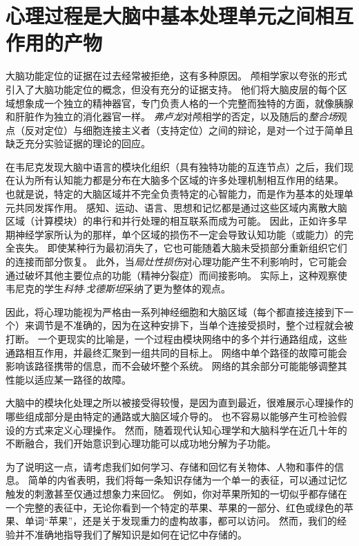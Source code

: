 \section{心理过程是大脑中基本处理单元之间相互作用的产物}

大脑功能定位的证据在过去经常被拒绝，这有多种原因。
颅相学家以夸张的形式引入了大脑功能定位的概念，但没有充分的证据支持。
他们将大脑皮层的每个区域想象成一个独立的精神器官，专门负责人格的一个完整而独特的方面，就像胰腺和肝脏作为独立的消化器官一样。
\textit{弗卢龙}对颅相学的否定，以及随后的\textit{整合场}观点（反对定位）与细胞连接主义者（支持定位）之间的辩论，是对一个过于简单且缺乏充分实验证据的理论的回应。


在韦尼克发现大脑中语言的模块化组织（具有独特功能的互连节点）之后，我们现在认为所有认知能力都是分布在大脑多个区域的许多处理机制相互作用的结果。
也就是说，特定的大脑区域并不完全负责特定的心智能力，而是作为基本的处理单元共同发挥作用。
感知、运动、语言、思想和记忆都是通过这些区域内离散大脑区域（计算模块）的串行和并行处理的相互联系而成为可能。
因此，正如许多早期神经学家所认为的那样，单个区域的损伤不一定会导致认知功能（或能力）的完全丧失。
即使某种行为最初消失了，它也可能随着大脑未受损部分重新组织它们的连接而部分恢复。
此外，当\textit{局灶性损伤}对心理功能产生不利影响时，它可能会通过破坏其他主要位点的功能（精神分裂症）而间接影响。
实际上，这种观察使韦尼克的学生\textit{科特$\cdot$戈德斯坦}采纳了更为整体的观点。



因此，将心理功能视为严格由一系列神经细胞和大脑区域（每个都直接连接到下一个）来调节是不准确的，因为在这种安排下，当单个连接受损时，整个过程就会被打断。
一个更现实的比喻是，一个过程由模块网络中的多个并行通路组成，这些通路相互作用，并最终汇聚到一组共同的目标上。
网络中单个路径的故障可能会影响该路径携带的信息，而不会破坏整个系统。
网络的其余部分可能能够调整其性能以适应某一路径的故障。



大脑中的模块化处理之所以被接受得较慢，是因为直到最近，很难展示心理操作的哪些组成部分是由特定的通路或大脑区域介导的。
也不容易以能够产生可检验假设的方式来定义心理操作。
然而，随着现代认知心理学和大脑科学在近几十年的不断融合，我们开始意识到心理功能可以成功地分解为子功能。


为了说明这一点，请考虑我们如何学习、存储和回忆有关物体、人物和事件的信息。
简单的内省表明，我们将每一条知识存储为一个单一的表征，可以通过记忆触发的刺激甚至仅通过想象力来回忆。
例如，你对苹果所知的一切似乎都存储在一个完整的表征中，无论你看到一个特定的苹果、苹果的一部分、红色或绿色的苹果、单词“苹果”，还是关于发现重力的虚构故事，都可以访问。
然而，我们的经验并不准确地指导我们了解知识是如何在记忆中存储的。





